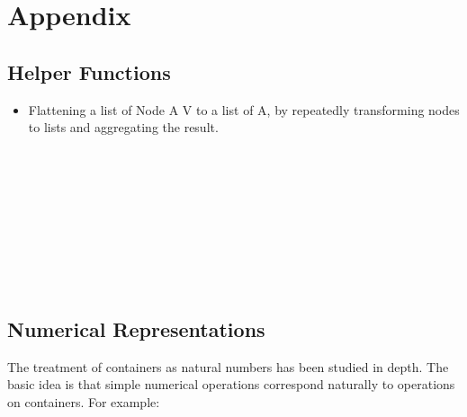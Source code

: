 \documentclass[12pt,twoside,notitlepage]{report}
\begin{document}
\chapter{Appendix}

\section{Helper Functions}
\label{app:helper}
\begin{itemize}

\item Flattening a list of Node A V to a list of A, by repeatedly transforming nodes to lists and aggregating the result.\\
\begin{code}
\\
\> \AgdaSymbol{:}  \AgdaSymbol{\{}\AgdaSymbol{\}\{} \AgdaSymbol{:}  \AgdaSymbol{\}\{} \AgdaSymbol{:}   \AgdaSymbol{\}}\<%
\\
\>[6]\<[14]%
\>[14]  \AgdaSymbol{:}   \<%
\\
\>[6]\<[14]%
\>[14]  \AgdaSymbol{:}    \<%
\\
\>[6]\<[14]%
\>[14]  \AgdaSymbol{(}  \AgdaSymbol{)}\<%
\\
\>[6]\<[14]%
\>[14]  \<%
\\
\> \AgdaInductiveConstructor{[]} \AgdaSymbol{=} \AgdaInductiveConstructor{[]}\<%
\\
\> \AgdaSymbol{(}  \AgdaSymbol{)} \AgdaSymbol{=} \AgdaSymbol{(} \AgdaSymbol{)} \AgdaFunction{++} \AgdaSymbol{(} \AgdaSymbol{)}\<%
\\
\end{code}


\end{itemize}
\section{Numerical Representations}
\label{app:numrep}
The treatment of containers as natural numbers has been studied in depth\cite{okasaki}. The basic idea is that simple numerical operations correspond naturally to operations on containers. For example:
\end{document}

